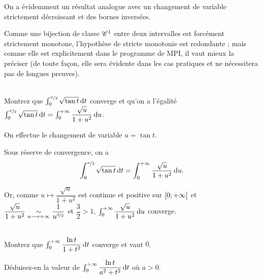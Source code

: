 \begin{rem}
On a évidemment un résultat analogue avec un changement de variable strictement décroissant et des bornes inversées.

Comme une bijection de classe \(\mathscr{C}^{1}\) entre deux intervalles est forcément strictement monotone, l'hypothèse de stricte monotonie est redondante ; mais comme elle est explicitement dans le programme de MPI, il vaut mieux la préciser (de toute façon, elle sera évidente dans les cas pratiques et ne nécessitera pas de longues preuves).
\end{rem}

\begin{exo}~\\
Montrez que \(\int_0^{\nicefrac{\pi}{2}}\sqrt{\tan t}\odif{t}\) converge et qu'on a l'égalité \(\int_0^{\nicefrac{\pi}{2}}\sqrt{\tan t}\odif{t}=\int_0^{\pinf}\dfrac{\sqrt{u}}{1+u^2}\odif{u}\).
\end{exo}

\begin{corr}
On effectue le changement de variable \(u=\tan t\).

Sous réserve de convergence, on a \[\int_0^{\nicefrac{\pi}{2}}\sqrt{\tan t}\odif{t}=\int_0^{\pinf}\dfrac{\sqrt{u}}{1+u^2}\odif{u}.\]

Or, comme \(u\mapsto\dfrac{\sqrt{u}}{1+u^2}\) est continue et positive sur \(\left[0;+\infty\right[\) et \(\dfrac{\sqrt{u}}{1+u^2}\underset{u\longrightarrow+\infty}{\sim}\dfrac{1}{u^{\nicefrac{3}{2}}}\) et \(\dfrac{3}{2}>1\), \(\int_0^{\pinf}\dfrac{\sqrt{u}}{1+u^2}\odif{u}\) converge.
\end{corr}

\begin{exo}~\\
Montrez que \(\int_0^{\pinf}\dfrac{\ln t}{1+t^2}\odif{t}\) converge et vaut \(0\).

Déduisez-en la valeur de \(\int_0^{\pinf}\dfrac{\ln t}{a^2+t^2}\odif{t}\) où \(a>0\).
\end{exo}

